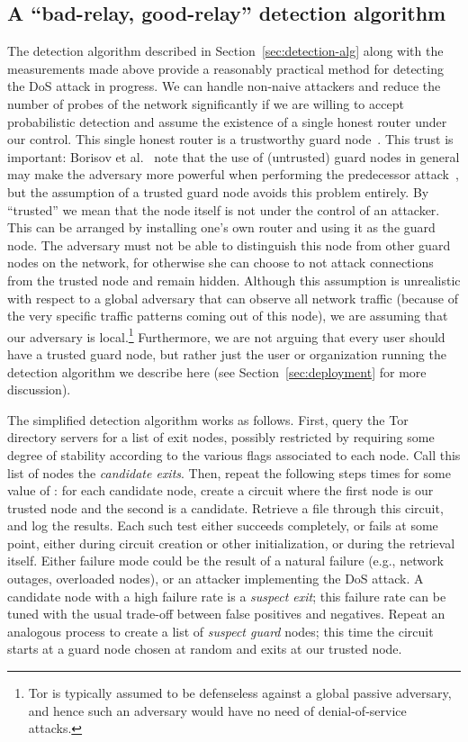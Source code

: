\documentclass[]{lmcs}
\begin{document}
\subsection{A ``bad-relay, good-relay'' detection algorithm}
\label{sec:practical}
The detection algorithm described in Section~\ref{sec:detection-alg}
along with the measurements made above provide a reasonably practical
method for detecting the DoS attack in progress.
We can handle non-naive attackers and
reduce the number of probes of the network significantly
if we are willing to accept probabilistic detection and assume
the existence of a single honest router under our
control.  
This single honest router is a trustworthy guard
node~\cite{wright-sosp2003}.  This trust is important:  
Borisov et al.~\citeyearpar{ccs07-doa}
note that the use of (untrusted) guard nodes in general may make the
adversary more powerful when performing the predecessor
attack~\cite{wright-ndss2002}, but the assumption of a trusted guard node
avoids this problem entirely.  
By ``trusted'' we
mean that the node itself is not under the control of an attacker.
This can be arranged by installing one's own router and using
it as the guard node.
The adversary must not be able to distinguish this node from
other guard nodes on the network, for otherwise she
can choose to not attack connections from the trusted node
and remain hidden.  
Although this assumption is unrealistic with respect to a global
adversary that can observe all network traffic (because
of the very specific traffic patterns coming out of this node),
we are assuming that our adversary is local.\footnote{Tor is typically
assumed to be defenseless against a global passive adversary,
and hence such an adversary would have no need of denial-of-service
attacks.}  Furthermore, we are not arguing that every user should
have a trusted guard node, but rather just the user or organization
running the detection algorithm we describe here 
(see Section~\ref{sec:deployment} for more discussion).

The simplified detection algorithm works as follows.
First, query the Tor directory servers for a list of exit nodes,
possibly restricted by requiring some degree of stability according
to the various flags associated to each node.
Call this list of nodes
the \textit{candidate exits}.  Then, repeat the following steps  times
for some value of :
for each candidate node, create a circuit
where the first node is our trusted node and the second is a
candidate.  Retrieve a file through this circuit, and log the results.
Each such test either succeeds completely, or fails at some point,
either during circuit creation or other initialization, or during the
retrieval itself.  Either failure mode could be the result of a
natural failure (e.g., network outages, overloaded nodes), or an
attacker implementing the DoS attack.  
A candidate node with a high failure rate
is a \textit{suspect exit}; this failure rate can be tuned with the usual
trade-off between false positives and negatives.
Repeat an analogous process to create a list of \emph{suspect guard} nodes;
this time the circuit starts at a guard node chosen at random
and exits at our trusted node.
\end{document}

